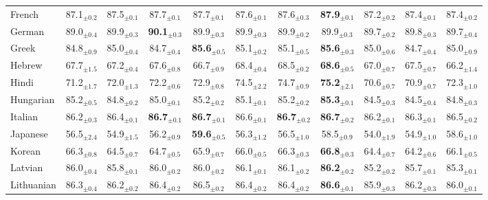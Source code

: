 \begin{table*}[ht]
{\begin{tabular}{lcccccccccc}
French & 87.1$_{\pm 0.2}$ & 87.5$_{\pm 0.1}$ & 87.7$_{\pm 0.1}$ & 87.7$_{\pm 0.1}$ & 87.6$_{\pm 0.1}$ & 87.6$_{\pm 0.3}$ & \textbf{87.9}$_{\pm 0.1}$ & 87.2$_{\pm 0.2}$ & 87.4$_{\pm 0.1}$ & 87.4$_{\pm 0.2}$ \\
German & 89.0$_{\pm 0.4}$ & 89.9$_{\pm 0.3}$ & \textbf{90.1}$_{\pm 0.3}$ & 89.9$_{\pm 0.3}$ & 89.9$_{\pm 0.3}$ & 89.9$_{\pm 0.2}$ & 89.9$_{\pm 0.3}$ & 89.7$_{\pm 0.2}$ & 89.8$_{\pm 0.3}$ & 89.7$_{\pm 0.4}$ \\
Greek & 84.8$_{\pm 0.9}$ & 85.0$_{\pm 0.4}$ & 84.7$_{\pm 0.4}$ & \textbf{85.6}$_{\pm 0.5}$ & 85.1$_{\pm 0.2}$ & 85.1$_{\pm 0.5}$ & \textbf{85.6}$_{\pm 0.3}$ & 85.0$_{\pm 0.6}$ & 84.7$_{\pm 0.4}$ & 85.0$_{\pm 0.9}$ \\
Hebrew & 67.7$_{\pm 1.5}$ & 67.2$_{\pm 0.4}$ & 67.6$_{\pm 0.8}$ & 66.7$_{\pm 0.9}$ & 68.4$_{\pm 0.4}$ & 68.5$_{\pm 0.2}$ & \textbf{68.6}$_{\pm 0.5}$ & 67.0$_{\pm 0.7}$ & 67.5$_{\pm 0.7}$ & 66.2$_{\pm 1.4}$ \\
Hindi & 71.2$_{\pm 1.7}$ & 72.0$_{\pm 1.3}$ & 72.2$_{\pm 0.6}$ & 72.9$_{\pm 0.8}$ & 74.5$_{\pm 2.2}$ & 74.7$_{\pm 0.9}$ & \textbf{75.2}$_{\pm 2.1}$ & 70.6$_{\pm 0.7}$ & 70.9$_{\pm 0.7}$ & 72.3$_{\pm 1.0}$ \\
Hungarian & 85.2$_{\pm 0.5}$ & 84.8$_{\pm 0.2}$ & 85.0$_{\pm 0.1}$ & 85.2$_{\pm 0.2}$ & 85.1$_{\pm 0.1}$ & 85.2$_{\pm 0.2}$ & \textbf{85.3}$_{\pm 0.1}$ & 84.5$_{\pm 0.3}$ & 84.5$_{\pm 0.4}$ & 84.8$_{\pm 0.3}$ \\
Italian & 86.2$_{\pm 0.3}$ & 86.4$_{\pm 0.1}$ & \textbf{86.7}$_{\pm 0.1}$ & \textbf{86.7}$_{\pm 0.1}$ & 86.6$_{\pm 0.1}$ & \textbf{86.7}$_{\pm 0.2}$ & \textbf{86.7}$_{\pm 0.2}$ & 86.2$_{\pm 0.1}$ & 86.3$_{\pm 0.1}$ & 86.5$_{\pm 0.2}$ \\
Japanese & 56.5$_{\pm 2.4}$ & 54.9$_{\pm 1.5}$ & 56.2$_{\pm 0.9}$ & \textbf{59.6}$_{\pm 0.5}$ & 56.3$_{\pm 1.2}$ & 56.5$_{\pm 1.0}$ & 58.5$_{\pm 0.9}$ & 54.0$_{\pm 1.9}$ & 54.9$_{\pm 1.0}$ & 58.6$_{\pm 1.0}$ \\
Korean & 66.3$_{\pm 0.8}$ & 64.5$_{\pm 0.7}$ & 64.7$_{\pm 0.5}$ & 65.9$_{\pm 0.7}$ & 66.0$_{\pm 0.5}$ & 66.3$_{\pm 0.3}$ & \textbf{66.8}$_{\pm 0.3}$ & 64.4$_{\pm 0.7}$ & 64.2$_{\pm 0.6}$ & 66.1$_{\pm 0.5}$ \\
Latvian & 86.0$_{\pm 0.4}$ & 85.8$_{\pm 0.1}$ & 86.0$_{\pm 0.2}$ & 86.0$_{\pm 0.2}$ & 86.1$_{\pm 0.1}$ & 86.1$_{\pm 0.2}$ & \textbf{86.2}$_{\pm 0.2}$ & 85.2$_{\pm 0.2}$ & 85.7$_{\pm 0.1}$ & 85.3$_{\pm 0.1}$ \\
Lithuanian & 86.3$_{\pm 0.4}$ & 86.2$_{\pm 0.2}$ & 86.4$_{\pm 0.2}$ & 86.5$_{\pm 0.2}$ & 86.4$_{\pm 0.2}$ & 86.4$_{\pm 0.2}$ & \textbf{86.6}$_{\pm 0.1}$ & 85.9$_{\pm 0.3}$ & 86.2$_{\pm 0.3}$ & 86.0$_{\pm 0.1}$ \\

\end{tabular}}
\end{table*}
